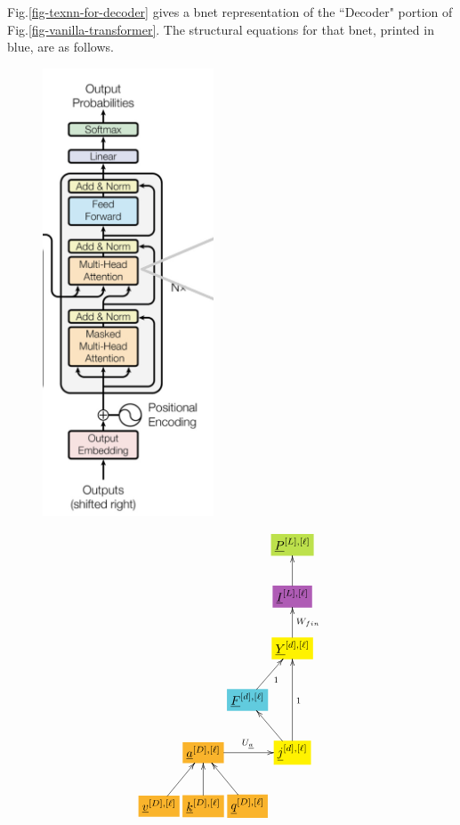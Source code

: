 Fig.\ref{fig-texnn-for-decoder}
gives a
bnet representation of
the ``Decoder"
portion of Fig.\ref{fig-vanilla-transformer}.
The structural equations for that bnet,
printed in blue, are as follows.

\begin{figure}[h!]\centering
\begin{minipage}{.4\linewidth}
\includegraphics[width=2in]{transformer/decoder.jpg}
\end{minipage}%
\begin{minipage}{.6\linewidth}
$$\xymatrix@R=2pc@C=0.2pc{
&&&*+[F*:SpringGreen]{\underline{P}^{[L],[\ell]}}
\\
&&&*+[F*:Orchid]{\underline{I}^{[L],[\ell]}}\ar[u]
\\
&&&*+[F*:yellow]{\underline{Y}^{[d], [\ell]}}\ar[u]_{W_{fin}}
\\
&&*+[F*:SkyBlue]{\underline{F}^{[d], [\ell]}}\ar[ur]_{1}&
\\
&*+[F*:Dandelion]{\underline{a}^{[D],[\ell]}}\ar[rr]^{U_\rva}&&*+[F*:yellow]{\underline{j}^{[d], [\ell]}}\ar[ul]\ar[uu]_{1}
\\
*+[F*:Dandelion]{\underline{v}^{[D], [\ell]}}\ar[ur]&*+[F*:Dandelion]{\underline{k}^{[D], [\ell]}}\ar[u]&*+[F*:Dandelion]{\underline{q}^{[D], [\ell]}}\ar[ul]&
\\
}$$
\end{minipage}
\end{figure}
